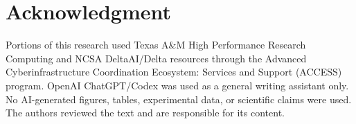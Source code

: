 \documentclass[conference]{IEEEtran}
\begin{document}
\section*{Acknowledgment}

Portions of this research used Texas A\&M High Performance Research Computing and NCSA DeltaAI/Delta resources through the Advanced Cyberinfrastructure Coordination Ecosystem: Services and Support (ACCESS) program. OpenAI ChatGPT/Codex was used as a general writing assistant only. No AI-generated figures, tables, experimental data, or scientific claims were used. The authors reviewed the text and are responsible for its content.
\end{document}
